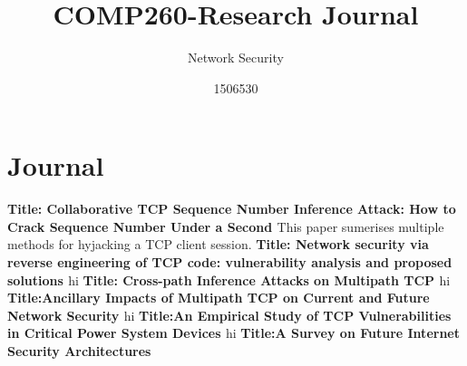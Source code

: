 \documentclass{scrartcl}
\title{COMP260-Research Journal}
\subtitle{Network Security}
\author{1506530}
\begin{document}
	
	
	\maketitle
	\section{Journal}
	
	\newline
	\newline
	\textbf{Title: Collaborative TCP Sequence Number Inference Attack: How to Crack Sequence Number Under a Second \cite{Inference}}
	\newline
This paper sumerises multiple methods for hyjacking a TCP client session.
	\newline
	\newline
	\newline
	\textbf{Title: Network security via reverse engineering of TCP code: vulnerability analysis and proposed solutions \cite{Reverse}}
	\newline
hi
	\newline
	\newline
	\newline
	\textbf{Title: Cross-path Inference Attacks on Multipath TCP \cite{Cross-Path}}
	\newline
hi
	\newline
	\newline
	\newline
	\textbf{Title:Ancillary Impacts of Multipath TCP on Current and Future Network Security \cite{Multipath}}
	\newline
hi
	\newline
	\newline
	\newline
	\textbf{Title:An Empirical Study of TCP Vulnerabilities in Critical Power System Devices \cite{Vulnerablilities}}
	\newline
hi
	\newline
	\newline
	\newline
	\textbf{Title:A Survey on Future Internet Security Architectures \cite{Future}}
	\newline

	
	
	
	
	
\end{document}
